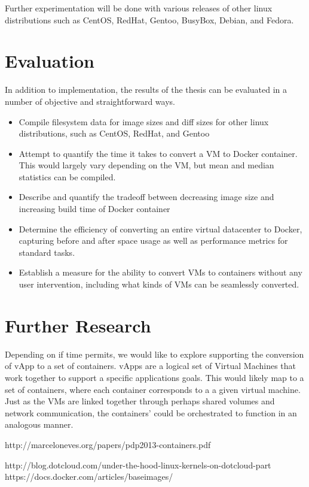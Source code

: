 \documentclass[\myfontsize, letterpaper]{article}
\begin{document}
Further experimentation will be done with various releases of other linux distributions such as CentOS, RedHat, Gentoo, BusyBox, Debian, and Fedora.



\section{Evaluation}

In addition to implementation, the results of the thesis can be evaluated in a number of objective and straightforward ways. 
\begin{itemize}
\item Compile filesystem data for image sizes and diff sizes for other linux distributions, such as CentOS, RedHat, and Gentoo
\item Attempt to quantify the time it takes to convert a VM to Docker container. This would largely vary depending on the VM, but mean and median statistics can be compiled.
\item Describe and quantify the tradeoff between decreasing image size and increasing build time of Docker container
\item Determine the efficiency of converting an entire virtual datacenter to Docker, capturing before and after space usage as well as performance metrics for standard tasks.
\item Establish a measure for the ability to convert VMs to containers without any user intervention, including what kinds of VMs can be seamlessly converted.
\end{itemize}

\section{Further Research}

Depending on if time permits, we would like to explore supporting the conversion of vApp to a set of containers. vApps are a logical set of Virtual Machines that work together to support a specific applications goals. This would likely map to a set of containers, where each container corresponds to a a given virtual machine. Just as the VMs are linked together through perhaps shared volumes and network communication, the containers' could be orchestrated to function in an analogous manner.


\begin{thebibliography}{99}
http://marceloneves.org/papers/pdp2013-containers.pdf

http://blog.dotcloud.com/under-the-hood-linux-kernels-on-dotcloud-part
https://docs.docker.com/articles/baseimages/
\end{thebibliography}
\end{document}
